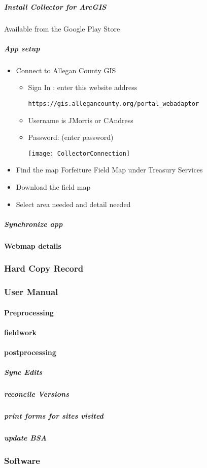 \documentclass[class=article , crop=false, titlepage, twoside, multi={itemize, figure, verbatim}, float=false]{standalone}
\begin{document}
\subparagraph{Install Collector for ArcGIS} Available from the Google Play Store

\subparagraph{App setup}

\begin{itemize}
\item Connect to Allegan County GIS

\begin{itemize}
\item Sign In : enter this website address

\begin{verbatim}
https://gis.allegancounty.org/portal_webadaptor
\end{verbatim}

\item Username is JMorris or CAndress
\item Password: (enter password)

\centering \texttt{[image: CollectorConnection]}
\end{itemize}

\item Find the map Forfeiture Field Map under Treasury Services
\item Download the field map
\item Select area needed and detail needed


\end{itemize}

\subparagraph{Synchronize app}

\paragraph{Webmap details}

\clearpage
\subsubsection{Hard Copy Record}
\clearpage
\subsubsection{User Manual}
\paragraph{Preprocessing}

\paragraph{fieldwork}

\paragraph{postprocessing}

\subparagraph{Sync Edits}

\subparagraph{reconcile Versions}

\subparagraph{print forms for sites visited}

\subparagraph{update BSA}

\clearpage
\subsubsection{Software}
\clearpage
\end{document}
